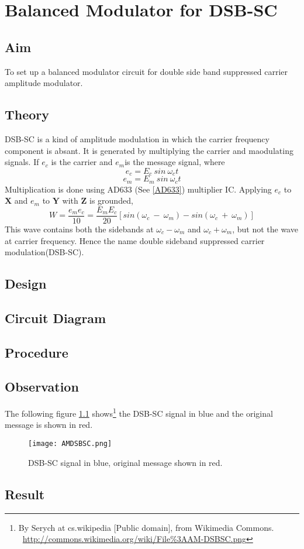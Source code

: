 \chapter[Balanced Modulator for DSB-SC]{Balanced Modulator for DSB-SC}
\section*{Aim}
To set up a balanced modulator circuit for double side band suppressed carrier amplitude modulator.
\section*{Theory}
DSB-SC is a kind of amplitude modulation in which the carrier frequency component is absant. It is generated by multiplying the carrier and maodulating signals. If $e_c$ is the carrier and $e_m$is the message signal, where
\begin{equation}
e_c=E_c\  sin\ \omega_ct
\end{equation}
\begin{equation}
e_m=E_m\  sin\ \omega_ct
\end{equation}
Multiplication is done using AD633 (See \ref{AD633}) multiplier IC.
Applying $e_c$ to $\textbf{X}$ and $e_m$ to $\textbf{Y}$ with $\textbf{Z}$ is grounded, 
\begin{equation}
W= \frac{e_me_c}{10} = \frac{E_mE_c}{20} [sin (\omega_c\ -\ \omega_m)-sin (\omega_c\ +\ \omega_m)]
\end{equation}
This wave contains both the sidebands at $\omega_c-\omega_m$ and $\omega_c+\omega_m$, but not the wave at carrier frequency. Hence the name double sideband suppressed carrier modulation(DSB-SC).
\section*{Design}

\section*{Circuit Diagram}
\section*{Procedure}
\section*{Observation}

The following figure \ref{DSBSC} shows\footnote{By Serych at cs.wikipedia [Public domain], from Wikimedia Commons.  \ \url{http://commons.wikimedia.org/wiki/File\%3AAM-DSBSC.png}} the DSB-SC signal in blue and the original message is shown in red.
\begin{figure}[h]
\texttt{[image: AMDSBSC.png]}
\caption{DSB-SC signal in blue, original message shown in red.}
\label{DSBSC}
\end{figure}


\section*{Result}
